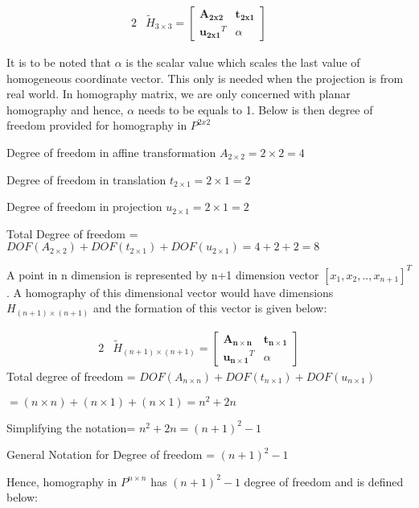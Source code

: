 \documentclass{article}
\begin{document}
\begin{alignat}{2}
&\tilde{H}_{3\times3} = \begin{bmatrix}
\mathbf{A_{2x2}} & \mathbf{t_{2x1}} \\
\mathbf{u_{2x1}}^{T} & \alpha
\end{bmatrix} & \quad   \label{eq:e1}
\end{alignat}

It is to be noted that \(\alpha\) is the scalar value which scales the last value of homogeneous coordinate vector. This only is needed when the projection is from real world. In homography matrix, we are only concerned with planar homography and hence, \(\alpha\) needs to be equals to 1. Below is then degree of freedom provided for homography in $P^{2x2}$ \newline

Degree of freedom in affine transformation $A_{2\times2}= 2\times2=4$

Degree of freedom in translation $t_{2\times1}= 2\times1= 2$

Degree of freedom in projection $u_{2\times1}= 2\times1=2$

Total Degree of freedom = $DOF(A_{2\times2})+ DOF(t_{2\times1})+ DOF(u_{2\times1})= 4+2+2= 8$ \newline

A point in n dimension is represented by n+1 dimension vector $[x_{1},x_{2},.., x_{n+1}]^{T}$. A homography of this dimensional vector would have dimensions $H_{(n+1)\times (n+1)}$ and the formation of this vector is given below:

\begin{alignat}{2}
&\tilde{H}_{(n+1)\times(n+1)} = \begin{bmatrix}
\mathbf{A_{n\times n}} & \mathbf{t_{n\times 1}} \\
\mathbf{u_{n\times 1}}^{T} & \alpha
\end{bmatrix} & \quad   \label{eq:e1}
\end{alignat}
\newline
Total degree of freedom = $DOF(A_{n\times n})+DOF(t_{n\times1})+DOF(u_{n\times1})$

$= (n \times n) + (n \times 1) + (n \times 1)= n^{2}+2n$

Simplifying the notation= $n^{2}+2n= (n+1)^{2}-1$


General Notation for Degree of freedom = $(n+1)^{2}-1$ \newline

Hence, homography in $P^{n \times n}$ has $(n+1)^{2} -1$ degree of freedom and is defined below:
\end{document}
